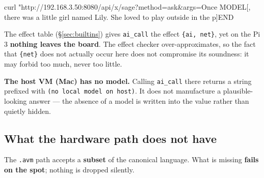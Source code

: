 \documentclass[11pt,a4paper]{article}
\newcommand{\eff}[1]{\texttt{\{#1\}}}
\begin{document}
\begin{term}
curl "http://192.168.3.50:8080/api/x/sage?method=ask&args=Once%
MODEL[, there was a little girl named Lily. She loved to play outside in the p]END
\end{term}

The effect table (\S\ref{sec:builtins}) gives \texttt{ai\_call} the effect
\eff{ai, net}, yet on the Pi 3 \textbf{nothing leaves the board}. The effect
checker over-approximates, so the fact that \eff{net} does not actually occur
here does not compromise its soundness: it may forbid too much, never too
little.

\textbf{The host VM (Mac) has no model.} Calling \texttt{ai\_call} there
returns a string prefixed with \texttt{(no local model on host)}. It does not
manufacture a plausible-looking answer --- the absence of a model is written
into the value rather than quietly hidden.

\subsection{What the hardware path does not have}

The \texttt{.avm} path accepts a \textbf{subset} of the canonical language.
What is missing \textbf{fails on the spot}; nothing is dropped silently.
\end{document}
